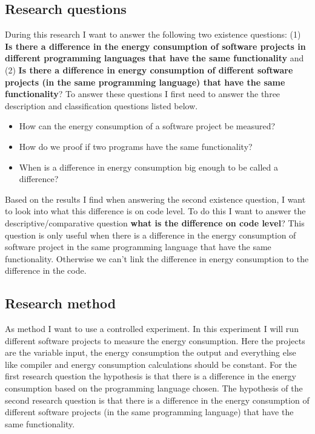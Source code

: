 \subsection{Research questions}
During this research I want to answer the following two existence questions: (1) \textbf{Is there a difference in the energy consumption of software projects in different programming languages that have the same functionality} and (2) \textbf{Is there a difference in energy consumption of different software projects (in the same programming language) that have the same functionality}? To answer these questions I first need to answer the three description and classification questions listed below.
\begin{itemize}
    \item How can the energy consumption of a software project be measured?
    \item How do we proof if two programs have the same functionality?
    \item When is a difference in energy consumption big enough to be called a difference?
\end{itemize}

Based on the results I find when answering the second existence question, I want to look into what this difference is on code level. To do this I want to answer the descriptive/comparative question \textbf{what is the difference on code level}? This question is only useful when there is a difference in the energy consumption of software project in the same programming language that have the same functionality. Otherwise we can't link the difference in energy consumption to the difference in the code.

\subsection{Research method}
As method I want to use a controlled experiment. In this experiment I will run different software projects to measure the energy consumption. Here the projects are the variable input, the energy consumption the output and everything else like compiler and energy consumption calculations should be constant.
For the first research question the hypothesis is that there is a difference in the energy consumption based on the programming language chosen. The hypothesis of the second research question is that there is a difference in the energy consumption of different software projects (in the same programming language) that have the same functionality.

